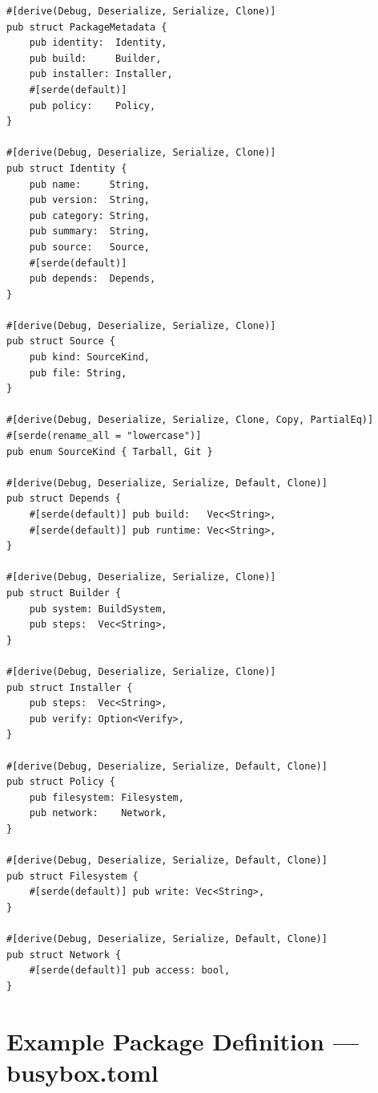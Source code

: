 \documentclass[12pt,a4paper]{report}
\begin{document}
\begin{lstlisting}[language={}, caption={PackageMetadata and related struct definitions --- cogman/src/schema.rs}]
#[derive(Debug, Deserialize, Serialize, Clone)]
pub struct PackageMetadata {
    pub identity:  Identity,
    pub build:     Builder,
    pub installer: Installer,
    #[serde(default)]
    pub policy:    Policy,
}

#[derive(Debug, Deserialize, Serialize, Clone)]
pub struct Identity {
    pub name:     String,
    pub version:  String,
    pub category: String,
    pub summary:  String,
    pub source:   Source,
    #[serde(default)]
    pub depends:  Depends,
}

#[derive(Debug, Deserialize, Serialize, Clone)]
pub struct Source {
    pub kind: SourceKind,
    pub file: String,
}

#[derive(Debug, Deserialize, Serialize, Clone, Copy, PartialEq)]
#[serde(rename_all = "lowercase")]
pub enum SourceKind { Tarball, Git }

#[derive(Debug, Deserialize, Serialize, Default, Clone)]
pub struct Depends {
    #[serde(default)] pub build:   Vec<String>,
    #[serde(default)] pub runtime: Vec<String>,
}

#[derive(Debug, Deserialize, Serialize, Clone)]
pub struct Builder {
    pub system: BuildSystem,
    pub steps:  Vec<String>,
}

#[derive(Debug, Deserialize, Serialize, Clone)]
pub struct Installer {
    pub steps:  Vec<String>,
    pub verify: Option<Verify>,
}

#[derive(Debug, Deserialize, Serialize, Default, Clone)]
pub struct Policy {
    pub filesystem: Filesystem,
    pub network:    Network,
}

#[derive(Debug, Deserialize, Serialize, Default, Clone)]
pub struct Filesystem {
    #[serde(default)] pub write: Vec<String>,
}

#[derive(Debug, Deserialize, Serialize, Default, Clone)]
pub struct Network {
    #[serde(default)] pub access: bool,
}
\end{lstlisting}

\section{Example Package Definition --- busybox.toml}
\end{document}
